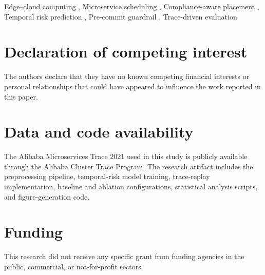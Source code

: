 \documentclass[a4paper,fleqn]{cas-dc}
\begin{document}
\begin{keywords}
Edge--cloud computing \sep
Microservice scheduling \sep
Compliance-aware placement \sep
Temporal risk prediction \sep
Pre-commit guardrail \sep
Trace-driven evaluation
\end{keywords}

\maketitle











\section*{Declaration of competing interest}

The authors declare that they have no known competing financial
interests or personal relationships that could have appeared to
influence the work reported in this paper.

\section*{Data and code availability}

The Alibaba Microservices Trace 2021 used in this study is publicly
available through the Alibaba Cluster Trace Program. The research
artifact includes the preprocessing pipeline, temporal-risk model
training, trace-replay implementation, baseline and ablation
configurations, statistical analysis scripts, and figure-generation code. 
\section*{Funding}

This research did not receive any specific grant from funding agencies
in the public, commercial, or not-for-profit sectors.




\end{document}

